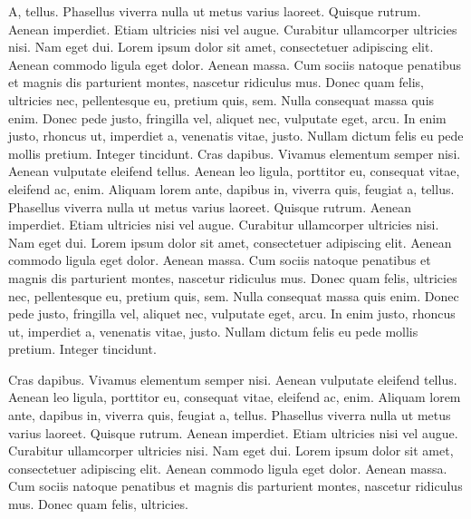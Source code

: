 \documentclass[
    12pt,
    letterpaper,
    oneside,
    noraggedright
]{turabian-researchpaper}
\begin{document}
A, tellus. Phasellus viverra nulla ut metus varius laoreet. Quisque
rutrum. Aenean imperdiet. Etiam ultricies nisi vel augue. Curabitur
ullamcorper ultricies nisi. Nam eget dui. Lorem ipsum dolor sit amet,
consectetuer adipiscing elit. Aenean commodo ligula eget dolor. Aenean
massa. Cum sociis natoque penatibus et magnis dis parturient montes,
nascetur ridiculus mus. Donec quam felis, ultricies nec, pellentesque
eu, pretium quis, sem. Nulla consequat massa quis enim. Donec pede
justo, fringilla vel, aliquet nec, vulputate eget, arcu. In enim justo,
rhoncus ut, imperdiet a, venenatis vitae, justo. Nullam dictum felis eu
pede mollis pretium. Integer tincidunt. Cras dapibus. Vivamus elementum
semper nisi. Aenean vulputate eleifend tellus. Aenean leo ligula,
porttitor eu, consequat vitae, eleifend ac, enim. Aliquam lorem ante,
dapibus in, viverra quis, feugiat a, tellus. Phasellus viverra nulla ut
metus varius laoreet. Quisque rutrum. Aenean imperdiet. Etiam ultricies
nisi vel augue. Curabitur ullamcorper ultricies nisi. Nam eget dui.
Lorem ipsum dolor sit amet, consectetuer adipiscing elit. Aenean commodo
ligula eget dolor. Aenean massa. Cum sociis natoque penatibus et magnis
dis parturient montes, nascetur ridiculus mus. Donec quam felis,
ultricies nec, pellentesque eu, pretium quis, sem. Nulla consequat massa
quis enim. Donec pede justo, fringilla vel, aliquet nec, vulputate eget,
arcu. In enim justo, rhoncus ut, imperdiet a, venenatis vitae, justo.
Nullam dictum felis eu pede mollis pretium. Integer tincidunt.

Cras dapibus. Vivamus elementum semper nisi. Aenean vulputate eleifend
tellus. Aenean leo ligula, porttitor eu, consequat vitae, eleifend ac,
enim. Aliquam lorem ante, dapibus in, viverra quis, feugiat a, tellus.
Phasellus viverra nulla ut metus varius laoreet. Quisque rutrum. Aenean
imperdiet. Etiam ultricies nisi vel augue. Curabitur ullamcorper
ultricies nisi. Nam eget dui. Lorem ipsum dolor sit amet, consectetuer
adipiscing elit. Aenean commodo ligula eget dolor. Aenean massa. Cum
sociis natoque penatibus et magnis dis parturient montes, nascetur
ridiculus mus. Donec quam felis, ultricies.
\end{document}
